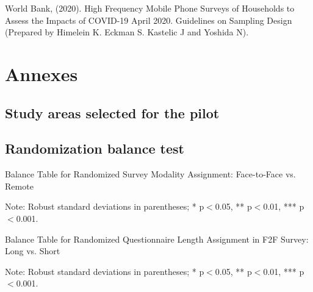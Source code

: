 \documentclass[11pt,harvard]{article}
\begin{document}
	World Bank, (2020). High Frequency Mobile Phone Surveys of Households to Assess the Impacts of COVID-19 April 2020. Guidelines on Sampling Design (Prepared by Himelein K. Eckman S. Kastelic J and Yoshida N).
	
	\pagebreak
	
	
	\section{Annexes}
	\subsection{Study areas selected for the pilot}
	
	\label{tab:ADMIN5_BF}
	
	\subsection{Randomization balance test}
	
	\begin{table}[htbp]
		\centering
		\begin{adjustbox}{max width=\textwidth}
			\begin{threeparttable}
				\caption{Balance Table for Randomized Survey Modality Assignment: Face-to-Face vs. Remote}
				\small
				 
				\label{tab:BF_Listing_Demo_Balance_Modality}
				\begin{tablenotes}
					\item Note: Robust standard deviations in parentheses; * p$<$0.05, ** p$<$0.01, *** p$<$0.001. 
				\end{tablenotes}
			\end{threeparttable}
		\end{adjustbox}
	\end{table}
	
	
	
	\begin{table}[htbp]
		\centering
		\begin{adjustbox}{max width=\textwidth}
			\begin{threeparttable}
				\caption{Balance Table for Randomized Questionnaire Length Assignment in F2F Survey: Long vs. Short}
				\small
				 
				\label{tab:BF_Listing_Demo_Balance_F2F_Length}
				\begin{tablenotes}
					\item Note: Robust standard deviations in parentheses; * p$<$0.05, ** p$<$0.01, *** p$<$0.001.
				\end{tablenotes}
			\end{threeparttable}
		\end{adjustbox}
	\end{table}
	
\end{document}
